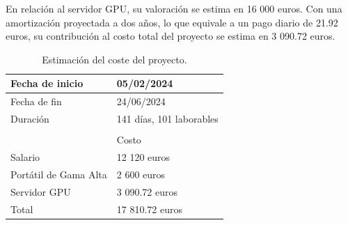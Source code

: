 En relación al servidor GPU, su valoración se estima en 16 000 euros. Con una amortización proyectada a dos años, lo que equivale a un pago diario de 21.92 euros, su contribución al costo total del proyecto se estima en 3 090.72 euros.


\begin{table}[H]
	\centering
	\begin{tabular}{ll}
	\hline
	\multicolumn{1}{|l|}{\cellcolor[HTML]{FFCB2F}Fecha de inicio} & \multicolumn{1}{l|}{05/02/2024} \\ \hline
	\multicolumn{1}{|l|}{\cellcolor[HTML]{FFCB2F}Fecha de fin} & \multicolumn{1}{l|}{24/06/2024} \\ \hline
	\multicolumn{1}{|l|}{\cellcolor[HTML]{FFCB2F}Duración} & \multicolumn{1}{l|}{141 días, 101 laborables} \\ \hline
	 &  \\ \hline
	\rowcolor[HTML]{FFCB2F} 
	\multicolumn{1}{|l|}{\cellcolor[HTML]{FFCB2F}Item} & \multicolumn{1}{l|}{\cellcolor[HTML]{FFCB2F}Costo} \\ \hline
	\multicolumn{1}{|l|}{Salario} & \multicolumn{1}{l|}{12 120 euros} \\ \hline
	\multicolumn{1}{|l|}{Portátil de Gama Alta} & \multicolumn{1}{l|}{2 600 euros} \\ \hline
	\multicolumn{1}{|l|}{Servidor GPU} & \multicolumn{1}{l|}{3 090.72 euros} \\ \hline
	\multicolumn{1}{|l|}{\cellcolor[HTML]{FFCB2F}Total} & \multicolumn{1}{l|}{17 810.72 euros} \\ \hline
	\end{tabular}
	\caption{Estimación del coste del proyecto.}
	\label{tab:coste-proyecto}
\end{table}